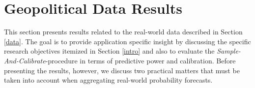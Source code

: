 \documentclass[aoas, preprint]{imsart}
\numberwithin{equation}{section}
\theoremstyle{plain}
\begin{document}
%
%
%
%
%
%




\section{Geopolitical Data Results}
\label{realData}
\noindent
This section presents results related to the real-world data described in Section \ref{data}. The goal is to provide application specific insight by discussing the specific research objectives itemized in Section \ref{intro} and also to evaluate the \textit{Sample-And-Calibrate}-procedure in terms of predictive power and calibration. Before presenting the results, however, we discuss two practical matters that must be taken into account when aggregating real-world  probability forecasts.
\end{document}
